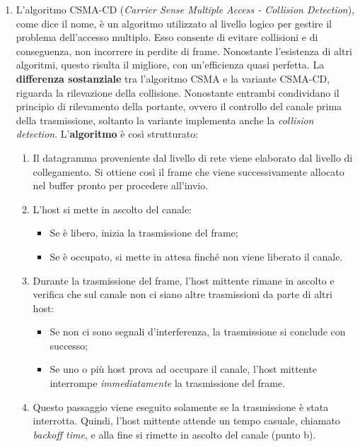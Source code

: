 \documentclass[a4paper]{article}
\begin{document}
	\begin{enumerate}
		\item L'algoritmo CSMA-CD (\emph{Carrier Sense Multiple Access - Collision Detection}), come dice il nome, è un algoritmo utilizzato al livello logico per gestire il problema dell'accesso multiplo. Esso consente di evitare collisioni e di conseguenza, non incorrere in perdite di frame.\newline
		Nonostante l'esistenza di altri algoritmi, questo risulta il migliore, con un'efficienza quasi perfetta. La \textbf{differenza sostanziale} tra l'algoritmo CSMA e la variante CSMA-CD, riguarda la rilevazione della collisione. Nonostante entrambi condividano il principio di rilevamento della portante, ovvero il controllo del canale prima della trasmissione, soltanto la variante implementa anche la \emph{collision detection}. L'\textbf{algoritmo} è così strutturato:
		\begin{enumerate}
			\item Il datagramma proveniente dal livello di rete viene elaborato dal livello di collegamento. Si ottiene così il frame che viene successivamente allocato nel buffer pronto per procedere all'invio.
			
			\item L'host si mette in ascolto del canale:
			\begin{itemize}
				\item Se è libero, inizia la trasmissione del frame;
				\item Se è occupato, si mette in attesa finché non viene liberato il canale.
			\end{itemize}
			
			\item Durante la trasmissione del frame, l'host mittente rimane in ascolto e verifica che sul canale non ci siano altre trasmissioni da parte di altri host:
			\begin{itemize}
				\item Se non ci sono segnali d'interferenza, la trasmissione si conclude con successo;
				\item Se uno o più host prova ad occupare il canale, l'host mittente interrompe \emph{immediatamente} la trasmissione del frame.
			\end{itemize}
			
			\item Questo passaggio viene eseguito solamente se la trasmissione è stata interrotta. Quindi, l'host mittente attende un tempo casuale, chiamato \emph{backoff time}, e alla fine si rimette in ascolto del canale (punto b).
		\end{enumerate}
		

\end{enumerate}
\end{document}
